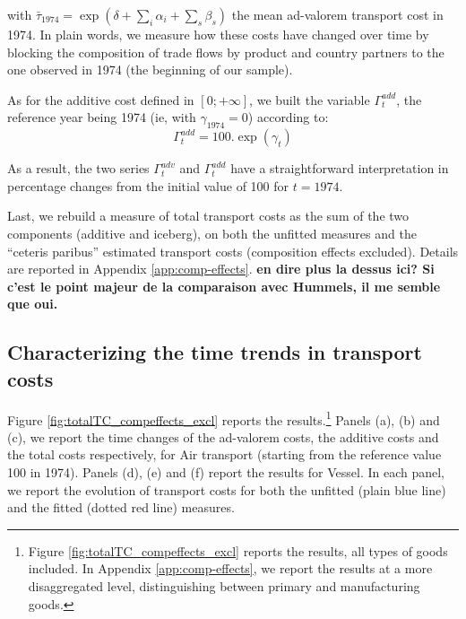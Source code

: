 \documentclass[a4paper,11pt]{article}
\begin{document}
\noindent with $\bar{\tau}_{1974} = \exp(\delta +\sum_i \alpha_i +\sum_s \beta_s)$ the mean ad-valorem transport cost in 1974. In plain words, we measure how these costs have changed over time by blocking the composition of trade flows by product and country partners to the one observed in 1974 (the beginning of our sample).

As for the additive cost defined in $[0;+\infty]$, we built the variable $\Gamma^{add}_t$, the reference year being 1974 (ie, with $\gamma_{1974}=0$) according to:
\begin{equation}
\Gamma^{add}_t = 100.\exp(\gamma_t) \label{eq:comp_effects_add}
\end{equation}

\noindent As a result, the two series $\Gamma^{adv}_t$ and $\Gamma^{add}_t$ have a straightforward interpretation in percentage changes from the initial value of 100 for $t=1974$.

Last, we rebuild a measure of total transport costs as the sum of the two components (additive and iceberg), on both the unfitted measures  and the ``ceteris paribus'' estimated transport costs (composition effects excluded). Details are reported in Appendix \ref{app:comp-effects}. \textbf{en dire plus la dessus ici? Si c'est le point majeur de la comparaison avec Hummels, il me semble que oui.}


\subsection{Characterizing the time trends in transport costs}
Figure \ref{fig:totalTC_compeffects_excl} reports the results.\footnote{Figure \ref{fig:totalTC_compeffects_excl} reports the results, all types of goods included. In Appendix \ref{app:comp-effects}, we report the results at a more disaggregated level, distinguishing between primary and manufacturing goods.} Panels (a), (b) and (c), we report the time changes of the ad-valorem costs, the additive costs and the total costs respectively, for Air transport (starting from the reference value 100 in 1974). Panels (d), (e) and (f) report the results for Vessel. In each panel, we report the evolution of transport costs for both the unfitted (plain blue line) and the fitted (dotted red line) measures.
\end{document}
